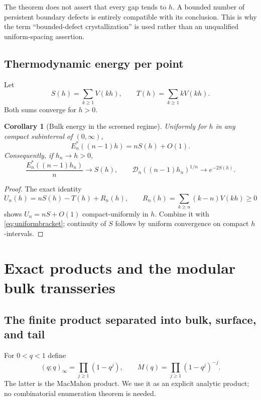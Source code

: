 \documentclass[11pt,a4paper]{article}
\newtheorem{corollary}[theorem]{Corollary}
\theoremstyle{definition}
\theoremstyle{remark}
\newcommand{\Dopt}{\mathcal D}
\begin{document}
The theorem does not assert that every gap tends to $h$. A bounded number
of persistent boundary defects is entirely compatible with its conclusion.
This is why the term ``bounded-defect crystallization'' is used rather than
an unqualified uniform-spacing assertion.

\subsection{Thermodynamic energy per point}
Let
\begin{equation}
 S(h)=\sum_{k\ge1}V(kh),\qquad T(h)=\sum_{k\ge1}kV(kh).
 \label{eq:ST}
\end{equation}
Both sums converge for $h>0$.

\begin{corollary}[Bulk energy in the screened regime]
\label{cor:bulk}
Uniformly for $h$ in any compact subinterval of $(0,\infty)$,
\begin{equation}
 E_n^*((n-1)h)=nS(h)+O(1).
 \label{eq:bulkenergy}
\end{equation}
Consequently, if $h_n\to h>0$,
\begin{equation}
 \frac{E_n^*((n-1)h_n)}n\longrightarrow S(h),\qquad
 \Dopt_n((n-1)h_n)^{1/n}\longrightarrow e^{-2S(h)}.
 \label{eq:bulkdet}
\end{equation}
\end{corollary}
\begin{proof}
The exact identity
\begin{equation}
 U_n(h)=nS(h)-T(h)+R_n(h),\qquad
 R_n(h)=\sum_{k\ge n}(k-n)V(kh)\ge0
 \label{eq:UR}
\end{equation}
shows $U_n=nS+O(1)$ compact-uniformly in $h$. Combine it with
\eqref{eq:uniformbracket}; continuity of $S$ follows by uniform convergence
on compact $h$-intervals.
\end{proof}

\section{Exact products and the modular bulk transseries}
\label{sec:qproducts}

\subsection{The finite product separated into bulk, surface, and tail}
For $0<q<1$ define
\begin{equation}
 (q;q)_\infty=\prod_{j\ge1}(1-q^j),\qquad
 M(q)=\prod_{j\ge1}(1-q^j)^{-j}.
 \label{eq:qproducts}
\end{equation}
The latter is the MacMahon product. We use it as an explicit analytic
product; no combinatorial enumeration theorem is needed.
\end{document}
